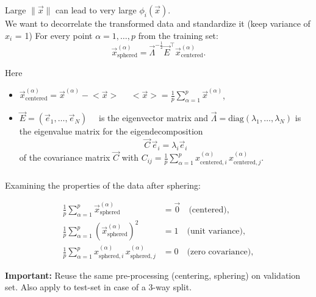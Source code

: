 \begin{frame}\frametitle{\subsecname}

Large $\lVert \vec x \rVert$ can lead to very large $\phi_i(\vec x)$. \\

We want to decorrelate the transformed data and standardize it (keep variance of $x_i$ = 1)
For every point $\alpha=1,\ldots,p$ from the training set:
\begin{equation}
\vec x^{(\alpha)}_\mathrm{sphered} = \vec \Lambda^{-\frac{1}{2}} \vec E^\top \vec x^{(\alpha)}_\mathrm{centered}.
\end{equation}

Here 
\begin{itemize}
 \item[]   
$\vec x^{(\alpha)}_\mathrm{centered} = \vec x^{(\alpha)} - \big<{\vec x}\big>\quad$ 
$\big<{\vec x}\big> = \frac{1}{p} \sum_{\alpha=1}^p \vec x^{(\alpha)}$,
\item[] $\vec E = (\vec e_1, \dots, \vec e_N)\quad$ is the eigenvector matrix and $\vec \Lambda = \mathrm{diag}(\lambda_1, \dots, \lambda_N)$ is the eigenvalue matrix for the eigendecomposition 
$$
\vec C \, \vec e_i = \lambda_i \vec e_i
$$ of the covariance matrix $\vec C$ with $C_{ij} = \frac{1}{p} \sum_{\alpha=1}^p x^{(\alpha)}_{\mathrm{centered},i} \, x^{(\alpha)}_{\mathrm{centered},j}$.
\end{itemize}


\end{frame}

\begin{frame}\frametitle{\subsecname}

Examining the properties of the data after sphering:

\begin{align}
\frac{1}{p}  \sum_{\alpha=1}^{p} \vec x^{(\alpha)}_\mathrm{sphered} &= \vec 0 \quad \text{(centered)},\\
\frac{1}{p}  \sum_{\alpha=1}^{p} (\vec x^{(\alpha)}_\mathrm{sphered})^{2} &=  1 \quad \text{(unit variance)},\\
\frac{1}{p}  \sum_{\alpha=1}^{p} x^{(\alpha)}_{\mathrm{sphered},i} \, x^{(\alpha)}_{\mathrm{sphered},j} &= 0 \quad \text{(zero covariance)},
\end{align}

\textbf{Important:} Reuse the same pre-processing (centering, sphering) on validation set. 
Also apply to test-set in case of a 3-way split.

\end{frame}

